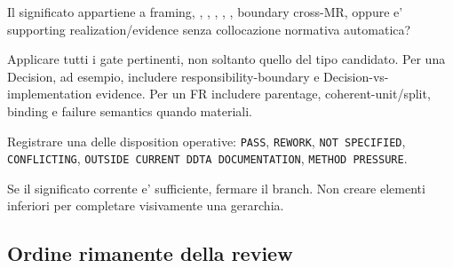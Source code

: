 \documentclass[11pt,a4paper]{article}
\begin{document}
\begin{ddtacheck}[title={3. Semantic owner}]
Il significato appartiene a framing, \MR, \DEC, \FR, \SR, \SECR, boundary cross-MR, oppure e' supporting realization/evidence senza collocazione normativa automatica?
\end{ddtacheck}

\begin{ddtacheck}[title={4. Relevant gates}]
Applicare tutti i gate pertinenti, non soltanto quello del tipo candidato. Per una Decision, ad esempio, includere responsibility-boundary e Decision-vs-implementation evidence. Per un FR includere parentage, coherent-unit/split, binding e failure semantics quando materiali.
\end{ddtacheck}

\begin{ddtacheck}[title={5. Explicit disposition}]
Registrare una delle disposition operative: \texttt{PASS}, \texttt{REWORK}, \texttt{NOT SPECIFIED}, \texttt{CONFLICTING}, \texttt{OUTSIDE CURRENT DDTA DOCUMENTATION}, \texttt{METHOD PRESSURE}.
\end{ddtacheck}

\begin{ddtacheck}[title={6. Stopping decision}]
Se il significato corrente e' sufficiente, fermare il branch. Non creare elementi inferiori per completare visivamente una gerarchia.
\end{ddtacheck}

\subsection{Ordine rimanente della review}
\end{document}
